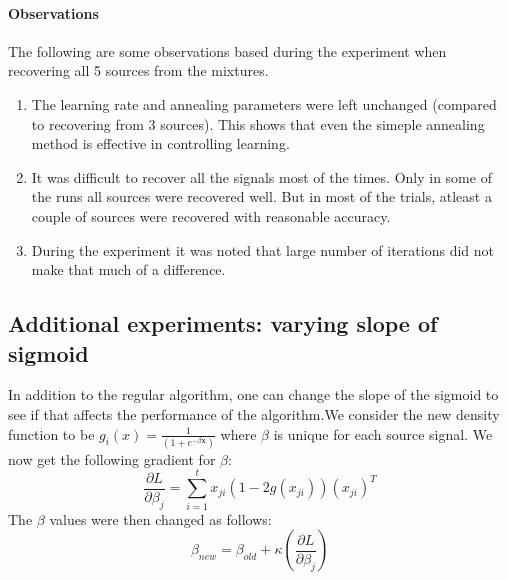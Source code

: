 \documentclass[11pt]{article}
\begin{document}
\paragraph{Observations}
The following are some observations based during the experiment when recovering all 5 sources from the mixtures.
\begin{enumerate}
\item The learning rate and annealing parameters were left unchanged (compared to recovering from 3 sources). This shows that even the simeple annealing method is effective in controlling learning.
\item It was difficult to recover all the signals most of the times. Only in some of the runs all sources were recovered well. But in most of the trials, atleast a couple of sources were recovered with reasonable accuracy.
\item During the experiment it was noted that large number of iterations did not make that much of a difference.
\end{enumerate}

\subsection{Additional experiments: varying slope of sigmoid}
In addition to the regular algorithm, one can change the slope of the sigmoid to see if that affects the performance of the algorithm.We consider the new density function to be $g_i(x) = \frac{1}{(1+e^{- \beta\textbf{x}})}$ where $\beta$ is unique for each source signal. We now get the following gradient for $\beta$:
$$ \frac{\partial L}{\partial \beta_j}  = \displaystyle\sum_{i=1}^{t} x_{ji} (1 - 2g(x_{ji})) (x_{ji})^T $$
The $\beta$ values were then changed as follows:
$$ \beta_{new} = \beta_{old} + \kappa \left( \frac{\partial L}{\partial \beta_j} \right)$$
\end{document}
